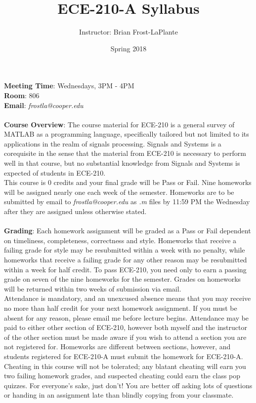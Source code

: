 \documentclass{article}
\title{ECE-210-A Syllabus}
\author{Instructor: Brian Frost-LaPlante}
\date{Spring 2018}
\begin{document}
\maketitle
\noindent\textbf{Meeting Time}: Wednesdays, 3PM - 4PM \\
\textbf{Room}: 806 \\
\textbf{Email}: \textit{frostla@cooper.edu} \\ \\
\textbf{Course Overview}: The course material for ECE-210 is a general survey of MATLAB as a programming language, specifically tailored but not limited to its applications in the realm of signals processing. Signals and Systems is a corequisite in the sense that the material from ECE-210 is necessary to perform well in that course, but no substantial knowledge from Signals and Systems is expected of students in ECE-210. \\
This course is 0 credits and your final grade will be Pass or Fail. Nine homeworks will be assigned nearly one each week of the semester. Homeworks are to be submitted by email to \textit{frostla@cooper.edu} as \textit{.m} files by 11:59 PM the Wednesday after they are assigned unless otherwise stated. \\ \\
\textbf{Grading}: Each homework assignment will be graded as a Pass or Fail dependent on timeliness, completeness, correctness and style. Homeworks that receive a failing grade for style may be resubmitted within a week with no penalty, while homeworks that receive a failing grade for any other reason may be resubmitted within a week for half credit. To pass ECE-210, you need only to earn a passing grade on seven of the nine homeworks for the semester. Grades on homeworks will be returned within two weeks of submission via email.\\
Attendance is mandatory, and an unexcused absence means that you may receive no more than half credit for your next homework assignment. If you must be absent for any reason, please email me before lecture begins. Attendance may be paid to either other section of ECE-210, however both myself and the instructor of the other section must be made aware if you wish to attend a section you are not registered for. Homeworks are different between sections, however, and students registered for ECE-210-A must submit the homework for ECE-210-A.\\ 
Cheating in this course will not be tolerated; any blatant cheating will earn you two failing homework grades, and suspected cheating could earn the class pop quizzes. For everyone's sake, just don't! You are better off asking lots of questions or handing in an assignment late than blindly copying from your classmate. \\ \\
\end{document}
